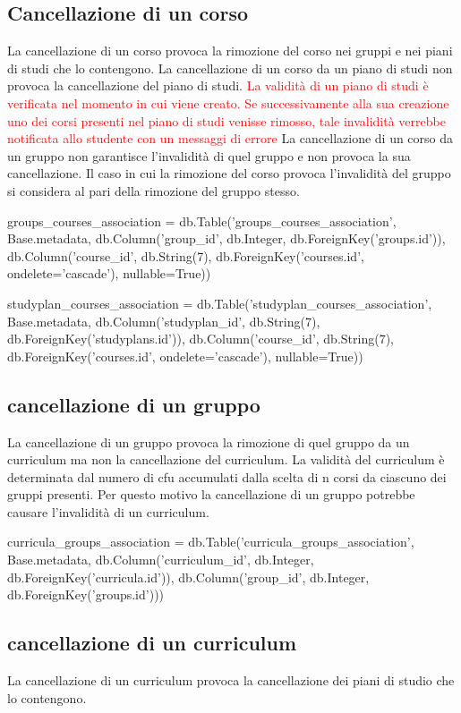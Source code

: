 \documentclass{article}
\begin{document}
\subsection{Cancellazione di un corso}
La cancellazione di un corso provoca la rimozione del corso nei gruppi e nei piani di studi che lo contengono.
La cancellazione di un corso da un piano di studi non provoca la cancellazione del piano di studi.
\textcolor{red}{La validità di un piano di studi è verificata nel momento in cui viene creato. Se successivamente alla sua creazione uno dei corsi presenti nel piano di studi venisse rimosso, tale invalidità verrebbe notificata allo studente con un messaggi di errore}
La cancellazione di un corso da un gruppo non garantisce l'invalidità di quel gruppo e non provoca la sua cancellazione.  Il caso in cui la rimozione  del corso provoca l'invalidità del gruppo si considera al pari della rimozione del gruppo stesso.
\begin{python}
groups_courses_association = db.Table('groups_courses_association', Base.metadata,
    db.Column('group_id', db.Integer, db.ForeignKey('groups.id')),
    db.Column('course_id', db.String(7), db.ForeignKey('courses.id',  ondelete='cascade'), nullable=True))

studyplan_courses_association = db.Table('studyplan_courses_association', Base.metadata,
    db.Column('studyplan_id', db.String(7), db.ForeignKey('studyplans.id')),
    db.Column('course_id', db.String(7), db.ForeignKey('courses.id',  ondelete='cascade'), nullable=True))
\end{python}

\subsection{cancellazione di un gruppo}
 La cancellazione di un gruppo provoca la rimozione di quel gruppo da un curriculum ma non la cancellazione del curriculum. La validità del curriculum è determinata dal numero di cfu accumulati dalla scelta di n corsi da ciascuno dei gruppi presenti. Per questo motivo la cancellazione di un gruppo potrebbe causare l'invalidità di un curriculum. 
\begin{python}
curricula_groups_association = db.Table('curricula_groups_association', Base.metadata,
    db.Column('curriculum_id', db.Integer, db.ForeignKey('curricula.id')),
    db.Column('group_id',  db.Integer, db.ForeignKey('groups.id')))
\end{python}


\subsection{cancellazione di un curriculum}
La cancellazione di un curriculum provoca la cancellazione dei piani di studio che lo contengono.
\end{document}
